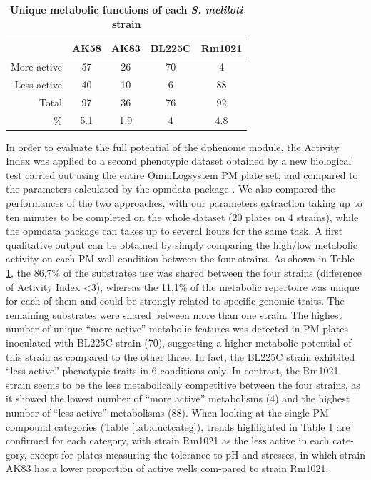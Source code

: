 \begin{table}[htbp]
  \centering
    \begin{tabular}{rcccc}
    \toprule
          & AK58  & AK83  & BL225C & Rm1021 \\
    \midrule
    More active & 57    & 26    & 70    & 4 \\
    Less active & 40    & 10    & 6     & 88 \\
    Total & 97    & 36    & 76    & 92 \\
    \%    & 5.1   & 1.9   & 4     & 4.8 \\
    \bottomrule
    \end{tabular}%
  \caption{\textbf{Unique metabolic functions of each \textit{S. meliloti} strain}}
  \label{tab:uniquemet}%
\end{table}%


In order to evaluate the full potential of the dphenome module, the Activity Index was applied to a second phenotypic dataset obtained by a new biological test carried out using the entire OmniLog\texttrademark system PM plate set, and compared to the parameters calculated by the opmdata package \cite{vaas2012visualization}. We also compared the performances of the two approaches, with our parameters extraction taking up to ten minutes to be completed on the whole dataset (20 plates on 4 strains), while the opmdata package can takes up to several hours for the same task. A first qualitative output can be obtained by simply comparing the high/low metabolic activity on each PM well condition between the four strains. As shown in Table \ref{tab:uniquemet}, the 86,7\% of the substrates use was shared between the four strains (difference of Activity Index <3), whereas the 11,1\% of the metabolic repertoire was unique for each of them and could be strongly related to specific genomic traits. The remaining substrates were shared between more than one strain. The highest number of unique “more active” metabolic features was detected in PM plates inoculated with BL225C strain (70), suggesting a higher metabolic potential of this strain as compared to the other three. In fact, the BL225C strain exhibited “less active” phenotypic traits in 6 conditions only. In contrast, the Rm1021 strain seems to be the less metabolically competitive between the four strains, as it showed the lowest number of “more active” metabolisms (4) and the highest number of “less active” metabolisms (88). When looking at the single PM compound categories (Table \ref{tab:ductcateg}), trends highlighted in Table \ref{tab:uniquemet} are confirmed for each category, with strain Rm1021 as the less active in each cate-gory, except for  plates measuring the tolerance to pH and stresses, in which strain AK83 has a lower proportion of active wells com-pared to strain Rm1021.

